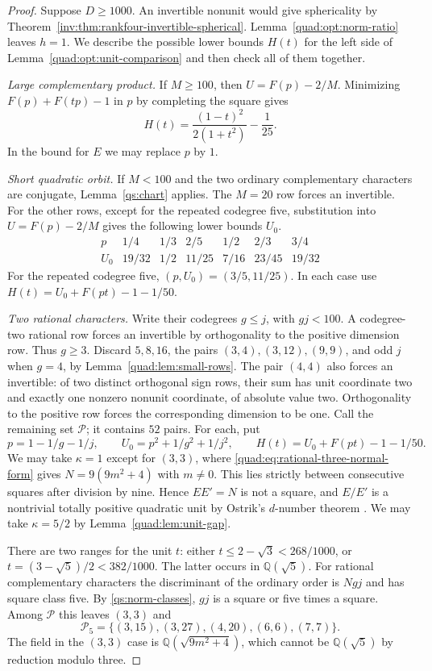 \documentclass[11pt,a4paper]{article}
\theoremstyle{definition}\newtheorem{definition}[theorem]{Definition}
\theoremstyle{remark}\newtheorem{remark}[theorem]{Remark}
\newcommand{\Q}{\mathbb Q}
\numberwithin{equation}{section}
\begin{document}
\begin{proof}
Suppose $D\ge1000$. An invertible nonunit would give sphericality
by Theorem~\ref{inv:thm:rankfour-invertible-spherical}.
Lemma~\ref{quad:opt:norm-ratio} leaves $h=1$.
We describe the possible lower bounds $H(t)$ for the left side of
Lemma~\ref{quad:opt:unit-comparison} and then check all of them together.

\emph{Large complementary product.}
If $M\ge100$, then $U=F(p)-2/M$. Minimizing
$F(p)+F(tp)-1$ in $p$ by completing the square gives
\[
 H(t)=\frac{(1-t)^2}{2(1+t^2)}-\frac1{25}.
\]
In the bound for $E$ we may replace $p$ by $1$.

\emph{Short quadratic orbit.}
If $M<100$ and the two ordinary complementary characters are conjugate,
Lemma~\ref{qs:chart} applies. The $M=20$ row forces an invertible.
For the other rows, except for the repeated codegree five, substitution
into $U=F(p)-2/M$ gives the following lower bounds $U_0$.
\[
\begin{array}{c|rrrrrr}
p&1/4&1/3&2/5&1/2&2/3&3/4\\\hline
U_0&19/32&1/2&11/25&7/16&23/45&19/32
\end{array}
\]
For the repeated codegree five, $(p,U_0)=(3/5,11/25)$.
In each case use $H(t)=U_0+F(pt)-1-1/50$.

\emph{Two rational characters.}
Write their codegrees $g\le j$, with $gj<100$. A codegree-two rational
row forces an invertible by orthogonality to the positive dimension
row. Thus $g\ge3$. Discard $5,8,16$, the pairs $(3,4),(3,12),(9,9)$,
and odd $j$ when $g=4$, by Lemma~\ref{quad:lem:small-rows}.
The pair $(4,4)$ also forces an invertible: of two distinct orthogonal
sign rows, their sum has unit coordinate two and exactly one nonzero
nonunit coordinate, of absolute value two. Orthogonality to the
positive row forces the corresponding dimension to be one.
Call the remaining set $\mathcal P$; it contains $52$ pairs. For each, put
\[
 p=1-1/g-1/j,\qquad U_0=p^2+1/g^2+1/j^2,
 \qquad H(t)=U_0+F(pt)-1-1/50 .
\]
We may take $\kappa=1$ except for $(3,3)$, where
\eqref{quad:eq:rational-three-normal-form} gives
$N=9(9m^2+4)$ with $m\ne0$. This lies strictly between consecutive
squares after division by nine. Hence $EE'=N$ is not a square,
and $E/E'$ is a nontrivial totally positive quadratic unit by
Ostrik's $d$-number theorem \cite{OstrikCodegrees}. We may take
$\kappa=5/2$ by Lemma~\ref{quad:lem:unit-gap}.

There are two ranges for the unit $t$: either $t\le2-\sqrt3<268/1000$,
or $t=(3-\sqrt5)/2<382/1000$. The latter occurs in $\Q(\sqrt5)$.
For rational complementary characters the discriminant of the ordinary
order is $Ngj$ and has square class five. By \eqref{qs:norm-classes},
$gj$ is a square or five times a square. Among $\mathcal P$ this
leaves $(3,3)$ and
\[
 \mathcal P_5=\{(3,15),(3,27),(4,20),(6,6),(7,7)\}.
\]
The field in the $(3,3)$ case is $\Q(\sqrt{9m^2+4})$, which cannot be
$\Q(\sqrt5)$ by reduction modulo three.


\end{proof}
\end{document}
